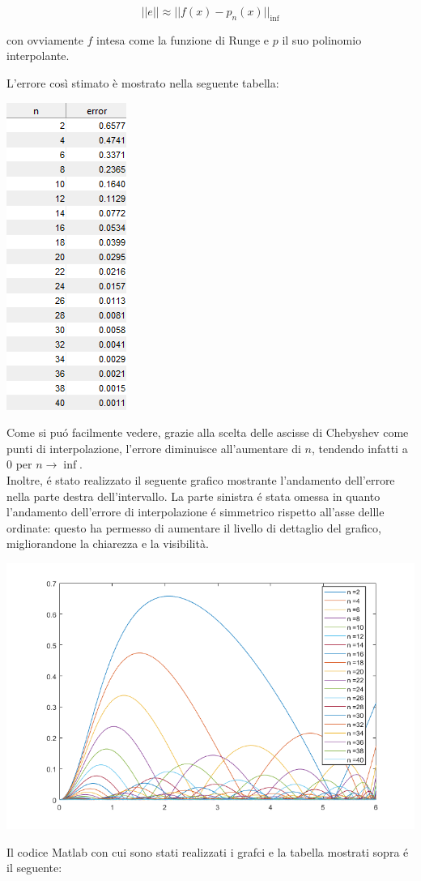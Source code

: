 $$
||e|| \approx ||f(x) - p_n(x)||_{\inf}
$$

\noindent con ovviamente $f$ intesa come la funzione di Runge e $p$ il suo polinomio interpolante.

\noindent L'errore così stimato è mostrato nella seguente tabella:

\begin{center}
	\includegraphics[scale=0.7]{cap4/4_7/4_7_error.png}
\end{center}

\noindent Come si pu\'o facilmente vedere, grazie alla scelta delle ascisse di Chebyshev come punti di interpolazione, l'errore diminuisce all'aumentare di \(n\), tendendo infatti a \(0\) per \(n \to \inf\).\\

\noindent Inoltre, \'e stato realizzato il seguente grafico mostrante l'andamento dell'errore nella parte destra dell'intervallo. La parte sinistra \'e stata omessa in quanto l'andamento dell'errore di interpolazione \'e simmetrico rispetto all'asse dellle ordinate: questo ha permesso di aumentare il livello di dettaglio del grafico, migliorandone la chiarezza e la visibilità.

\begin{center}
	\includegraphics[scale=0.7]{cap4/4_7/4_7_error_plot.png}
\end{center}

\newpage

\noindent Il codice Matlab con cui sono stati realizzati i grafci e la tabella mostrati sopra \'e il seguente: \\



